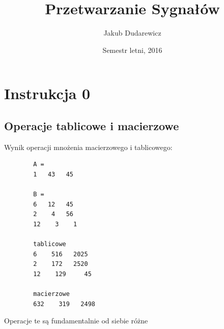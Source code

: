 \documentclass[12pt,titlepage]{report}
\title{Przetwarzanie Sygnałów}
\author{Jakub Dudarewicz}
\date{Semestr letni, 2016}
\begin{document}
\begin{titlepage}
	\maketitle
\end{titlepage}
	
	\def\thesection{Zadanie \arabic{section}.\Large}
	\def\thesubsection{Zadanie \arabic{section}.\arabic{subsection}\normalsize}
	\def\theparagraph{\normalsize}%
\section{Instrukcja 0}
\subsection{Operacje tablicowe i macierzowe}

Wynik operacji mnożenia macierzowego i tablicowego:
\begin{multicols}{2}
	{
		\small
		\begin{verbatim}
		A =		
		1   43   45
		
		B =		
		6   12   45
		2    4   56
		12    3    1
		
		tablicowe
		6    516   2025
		2    172   2520
		12    129     45
		
		macierzowe
		632    319   2498
		\end{verbatim}
	}
\end{multicols}
Operacje te są fundamentalnie od siebie różne
\end{document}
